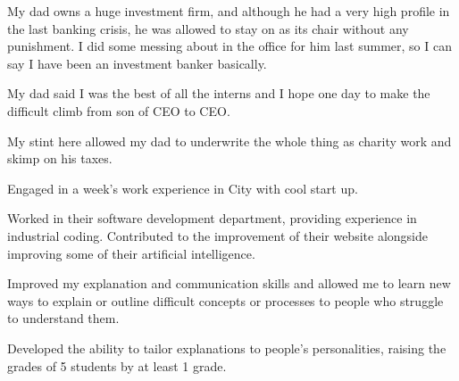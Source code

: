     \sectionspace %

        \begin{tightitemize}
            \item My dad owns a huge investment firm, and although he had a very high profile in the last banking crisis, he was allowed to stay on as its chair without any
            punishment. I did some messing about in the office for him last summer, so I can say I have been an investment banker basically.
            \item My dad said I was the best of all the interns and I hope one day to make the difficult climb from son of CEO to CEO. 
            \item My stint here allowed my dad to underwrite the whole thing as charity work and skimp on his taxes.
        \end{tightitemize}

    \sectionspace %


        \begin{tightitemize}
            \item Engaged in a week's work experience in City with cool start up.
            \item Worked in their software development department, providing experience in industrial coding. Contributed to the improvement of their website alongside improving
            some of their artificial intelligence.
        \end{tightitemize}

    \sectionspace %

        \begin{tightitemize}
            \item Improved my explanation and communication skills and allowed me to learn new ways to explain or outline difficult concepts or processes to people who struggle
            to understand them.
            \item Developed the ability to tailor explanations to people's personalities, raising the grades of 5 students by at least 1 grade.
        \end{tightitemize}

